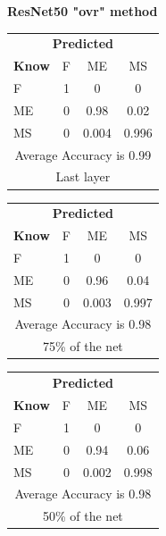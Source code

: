 \documentclass[12pt]{article} %
\begin{document}
\begin{center}
\textbf{ ResNet50 "ovr" method}
\end{center}
\begin{minipage}{0.5\textwidth}
\begin{center}
\begin{tabular}{l|c|c|c|}
 \multicolumn{4}{c}{ \textbf{ Predicted}}\\
 \textbf{Know}&F&ME&MS\\ \hline\hline
F   &1&0&0\\
ME &0&0.98&0.02\\
MS &0&0.004&0.996\\
\multicolumn{4}{c}{Average Accuracy is 0.99}\\
\multicolumn{4}{c}{Last layer}\\
\end{tabular}
\end{center}
\end{minipage}
\begin{minipage}{0.5\textwidth}
\begin{center}
\begin{tabular}{l|c|c|c|}
 \multicolumn{4}{c}{ \textbf{ Predicted}}\\
 \textbf{Know}&F&ME&MS\\ \hline\hline
F    &1&0&0\\
ME &0&0.96&0.04\\
MS &0&0.003&0.997\\
\multicolumn{4}{c}{Average Accuracy is 0.98}\\
\multicolumn{4}{c}{75\%  of the net}\\
\end{tabular}
\end{center}
\end{minipage}
\begin{minipage}{0.5\textwidth}
\begin{center}
\begin{tabular}{l|c|c|c|}
 \multicolumn{4}{c}{ \textbf{ Predicted}}\\
 \textbf{Know}&F&ME&MS\\ \hline\hline
F   &1&0&0\\
ME &0&0.94&0.06\\
MS &0&0.002&0.998\\
\multicolumn{4}{c}{Average Accuracy is 0.98}\\
\multicolumn{4}{c}{50\%  of the net}\\
\end{tabular}
\end{center}
\end{minipage}
\end{document}
